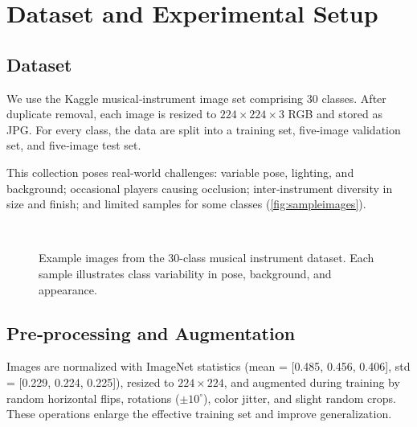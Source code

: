 
\section{Dataset and Experimental Setup}

\subsection{Dataset}
\noindent
We use the Kaggle musical‑instrument image set \cite{gpiosenka2021} comprising 30 classes. After duplicate removal, each image is resized to $224 \times 224 \times 3$ RGB and stored as JPG. For every class, the data are split into a training set, five‑image validation set, and five‑image test set.

\noindent
This collection poses real‑world challenges: variable pose, lighting, and background; occasional players causing occlusion; inter‑instrument diversity in size and finish; and limited samples for some classes (\autoref{fig:sampleimages}).

\begin{figure}[htbp]
    \centering
    \\[1ex]
    \caption{Example images from the 30-class musical instrument dataset. Each sample illustrates class variability in pose, background, and appearance.}
    \label{fig:sampleimages}
\end{figure}



\subsection{Pre‑processing and Augmentation}
\noindent
Images are normalized with ImageNet statistics (mean = [0.485, 0.456, 0.406], std = [0.229, 0.224, 0.225]), resized to $224 \times 224$, and augmented during training by random horizontal flips, rotations ($\pm 10^\circ$), color jitter, and slight random crops. These operations enlarge the effective training set and improve generalization.

